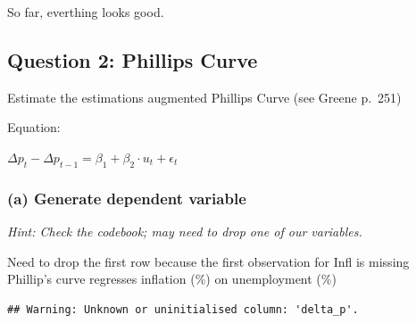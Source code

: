 \documentclass[11pt,]{article}
\newenvironment{Shaded}{\begin{snugshade}}{\end{snugshade}}
\newcommand{\KeywordTok}[1]{\textcolor[rgb]{0.13,0.29,0.53}{\textbf{#1}}}
\newcommand{\DataTypeTok}[1]{\textcolor[rgb]{0.13,0.29,0.53}{#1}}
\newcommand{\DecValTok}[1]{\textcolor[rgb]{0.00,0.00,0.81}{#1}}
\newcommand{\StringTok}[1]{\textcolor[rgb]{0.31,0.60,0.02}{#1}}
\newcommand{\CommentTok}[1]{\textcolor[rgb]{0.56,0.35,0.01}{\textit{#1}}}
\newcommand{\OtherTok}[1]{\textcolor[rgb]{0.56,0.35,0.01}{#1}}
\newcommand{\ControlFlowTok}[1]{\textcolor[rgb]{0.13,0.29,0.53}{\textbf{#1}}}
\newcommand{\OperatorTok}[1]{\textcolor[rgb]{0.81,0.36,0.00}{\textbf{#1}}}
\newcommand{\NormalTok}[1]{#1}
\begin{document}
So far, everthing looks good.

\subsection{Question 2: Phillips Curve}\label{question-2-phillips-curve}

Estimate the estimations augmented Phillips Curve (see Greene p.~251)

Equation:

\(\Delta p_t - \Delta p_{t-1} = \beta_1 + \beta_2\cdot u_t + \epsilon_t\)

\subsubsection{(a) Generate dependent
variable}\label{a-generate-dependent-variable}

\emph{Hint: Check the codebook; may need to drop one of our variables.}

Need to drop the first row because the first observation for Infl is
missing Phillip's curve regresses inflation (\%) on unemployment (\%)

\begin{Shaded}
\end{Shaded}

\begin{verbatim}
## Warning: Unknown or uninitialised column: 'delta_p'.
\end{verbatim}

\begin{Shaded}
\end{Shaded}
\end{document}
